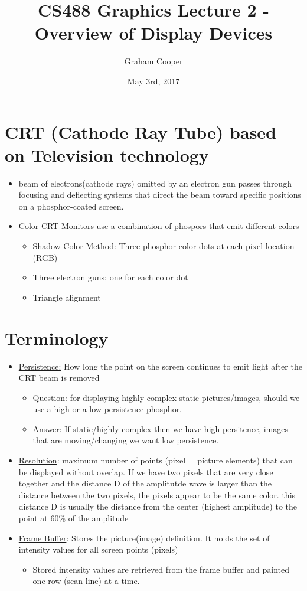 \documentclass[12pt]{article}
\title{\vspace{-15ex}CS488 Graphics Lecture 2 - Overview of Display Devices\vspace{-1ex}}
\date{May 3rd, 2017}
\author{Graham Cooper}
\begin{document}
	\maketitle
	
	\section*{CRT (Cathode Ray Tube) based on Television technology}
	
	\begin{itemize}
		\item beam of electrons(cathode rays) omitted by an electron gun passes through focusing and deflecting systems that direct the beam toward specific positions on a phosphor-coated screen.
		\item \underline{Color CRT Monitors} use a combination of phospors that emit different colors
		\begin{itemize}
			\item \underline{Shadow Color Method}: Three phosphor color dots at each pixel location (RGB)
			\item Three electron guns; one for each color dot
			\item Triangle alignment
		\end{itemize}
	\end{itemize}

	\section*{Terminology}
	\begin{itemize}
		\item \underline{Persistence:} How long the point on the screen continues to emit light after the CRT beam is removed
		\begin{itemize}
			\item Question: for displaying highly complex static pictures/images, should we use a high or a low persistence phosphor. 
			\item Answer: If static/highly complex then we have high persitence, images that are moving/changing we want low persistence.
		\end{itemize}
		\item \underline{Resolution}: maximum number of points (pixel = picture elements) that can be displayed without overlap. If we have two pixels that are very close together and the distance D of the amplitutde wave is larger than the distance between the two pixels, the pixels appear to be the same color. this distance D is usually the distance from the center (highest amplitude) to the point at 60\% of the amplitude
		\item \underline{Frame Buffer}: Stores the picture(image) definition. It holds the set of intensity values for all screen points (pixels)
		\begin{itemize}
			\item Stored intensity values are retrieved from the frame buffer and painted one row (\underline{scan line}) at a time.
		\end{itemize}
	\end{itemize}
\end{document}
